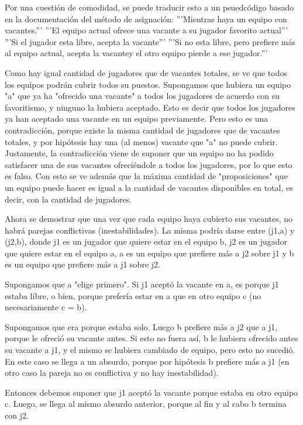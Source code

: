\documentclass[article,a4paper]{article}
\begin{document}
Por una cuestión de comodidad, se puede traducir esto a un psuedcódigo basado en la documentación del método de asignación:
'''Mientras haya un equipo con vacantes.'''
    '''El equipo actual ofrece una vacante a su jugador favorito actual'''
        '''Si el jugador esta libre, acepta la vacante'''
              '''Si no esta libre, pero prefiere más al equipo actual, acepta la vacantey el otro equipo pierde a ese jugador.'''

Como hay igual cantidad de jugadores que de vacantes totales, se ve que todos los equipos podrán cubrir todos su puestos. Supongamos que hubiera un equipo "a" que ya ha "ofrecido una vacante" a todos los jugadores de acuerdo con su favoritismo, y ninguno la hubiera aceptado. Esto es decir que todos los jugadores ya han aceptado una vacante en un equipo previamente. Pero esto es una contradicción, porque existe la misma cantidad de jugadores que de vacantes totales, y por hipótesis hay una (al menos) vacante que "a" no puede cubrir. Justamente, la contradicción viene de suponer que un equipo no ha podido satisfacer una de sus vacantes ofreciéndole a todos los jugadores, por lo que esto es falso. Con esto se ve además que la máxima cantidad de "proposiciones" que un equipo puede hacer es igual a la cantidad de vacantes disponibles en total, es decir, con la cantidad de jugadores.

Ahora se demostrar que una vez que cada equipo haya cubierto sus vacantes, no habrá parejas conflictivas (inestabilidades). La misma podría darse entre (j1,a) y (j2,b), donde j1 es un jugador que quiere estar en el equipo b, j2 es un jugador que quiere estar en el equipo a, a es un equipo que prefiere más a j2 sobre j1 y b es un equipo que prefiere más a j1 sobre j2.

Supongamos que a "elige primero". Si j1 aceptó la vacante en a, es porque j1 estaba libre, o bien, porque prefería estar en a que en otro equipo c (no necesariamente c = b).     

Supongamos que era porque estaba solo. Luego b prefiere más a j2 que a j1, porque le ofreció su vacante antes. Si esto no fuera así, b le hubiera ofrecido antes su vacante a j1, y el mismo se hubiera cambiado de equipo, pero esto no sucedió. En este caso se llega a un absurdo, porque por hipótesis b prefiere más a j1 (en otro caso la pareja no es conflictiva y no hay inestabilidad).

Entonces debemos suponer que j1 aceptó la vacante porque estaba en otro equipo c. Luego, se llega al mismo absurdo anterior, porque al fin y al cabo b termina con j2.
\end{document}
